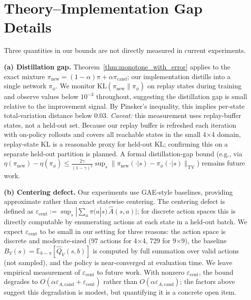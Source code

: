 \documentclass{article}
\theoremstyle{plain}
\theoremstyle{definition}
\theoremstyle{remark}
\newcommand{\E}{\mathbb{E}}
\newcommand{\KL}{\mathrm{KL}}
\begin{document}
\appendix
\section{Theory--Implementation Gap Details}
\label{app:theory_gaps}

Three quantities in our bounds are not directly measured in current experiments.

\textbf{(a) Distillation gap.}
Theorem~\ref{thm:monotone_with_error} applies to the exact mixture $\pi_{\mathrm{new}}{=}(1{-}\alpha)\pi{+}\alpha\pi_{\mathrm{cand}}$; our implementation distills into a single network $\pi_\phi$.
We monitor $\KL(\pi_{\mathrm{new}} \| \pi_\phi)$ on replay states during training and observe values below $10^{-3}$ throughout, suggesting the distillation gap is small relative to the improvement signal.
By Pinsker's inequality, this implies per-state total-variation distance below $0.03$.
\emph{Caveat:} this measurement uses replay-buffer states, not a held-out set.
Because our replay buffer is refreshed each iteration with on-policy rollouts and covers all reachable states in the small 4$\times$4 domain, replay-state KL is a reasonable proxy for held-out KL; confirming this on a separate held-out partition is planned.
A formal distillation-gap bound (e.g., via $\eta(\pi_{\mathrm{new}}) - \eta(\pi_\phi) \le \tfrac{2\gamma}{(1-\gamma)^2}\sup_s \|\pi_{\mathrm{new}}(\cdot|s) - \pi_\phi(\cdot|s)\|_{\mathrm{TV}}$) remains future work.

\textbf{(b) Centering defect.}
Our experiments use GAE-style baselines, providing approximate rather than exact statewise centering.
The centering defect is defined as $\varepsilon_{\mathrm{cent}} := \sup_s |\sum_a \pi(a|s)\,\widehat{A}(s,a)|$; for discrete action spaces this is directly computable by enumerating actions at each state in a held-out batch.
We expect $\varepsilon_{\mathrm{cent}}$ to be small in our setting for three reasons: the action space is discrete and moderate-sized (97 actions for 4$\times$4, 729 for 9$\times$9), the baseline $B_V(s) = \E_{b\sim\pi}[\widehat{Q}_V(s,b)]$ is computed by full summation over valid actions (not sampled), and the policy is near-converged at evaluation time.
We leave empirical measurement of $\varepsilon_{\mathrm{cent}}$ to future work.
With nonzero $\varepsilon_{\mathrm{cent}}$, the bound degrades to $O(\alpha\varepsilon_{A,\mathrm{cand}} + \varepsilon_{\mathrm{cent}})$ rather than $O(\alpha\varepsilon_{A,\mathrm{cand}})$; the factors above suggest this degradation is modest, but quantifying it is a concrete open item.
\end{document}
